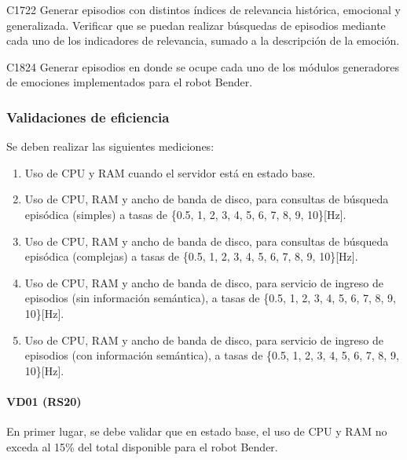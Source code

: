 \begin{def-validacion}{C}{17}{22}
Generar episodios con distintos índices de relevancia histórica, emocional y generalizada. Verificar que se puedan realizar búsquedas de episodios mediante cada uno de los indicadores de relevancia, sumado a la descripción de la emoción.	
\end{def-validacion}

\begin{def-validacion}{C}{18}{24}
	Generar episodios en donde se ocupe cada uno de los módulos generadores de emociones implementados para el robot Bender.
\end{def-validacion}


\subsubsection{Validaciones de eficiencia}


Se deben realizar las siguientes mediciones:
\begin{enumerate}
	\item Uso de CPU y RAM cuando el servidor está en estado base.
	\item Uso de CPU, RAM y ancho de banda de disco, para consultas de búsqueda episódica (simples) a tasas de \{0.5, 1, 2, 3, 4, 5, 6, 7, 8, 9, 10\}[Hz].
	\item Uso de CPU, RAM y ancho de banda de disco, para consultas de búsqueda episódica (complejas) a tasas de \{0.5, 1, 2, 3, 4, 5, 6, 7, 8, 9, 10\}[Hz].
	\item Uso de CPU, RAM y ancho de banda de disco, para servicio de ingreso de episodios (sin información semántica), a tasas de \{0.5, 1, 2, 3, 4, 5, 6, 7, 8, 9, 10\}[Hz].
	\item Uso de CPU, RAM y ancho de banda de disco, para servicio de ingreso de episodios (con información semántica), a tasas de \{0.5, 1, 2, 3, 4, 5, 6, 7, 8, 9, 10\}[Hz].
\end{enumerate}

\paragraph{VD01 (RS20)}
En primer lugar, se debe validar que en estado base, el uso de CPU y RAM no exceda al 15\% del total disponible para el robot Bender.

